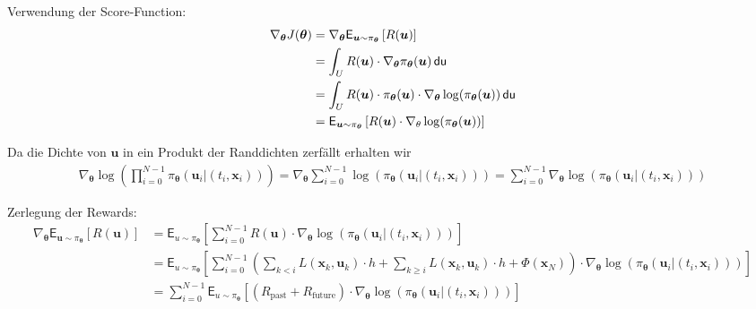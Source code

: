 \documentclass[a4paper, 12pt]{scrartcl}
\newcommand{\du}{\thinspace \mathsf{du}}
\begin{document}
Verwendung der Score-Function:
\begin{align*}
    \nabla_{\bm{\theta}} J(\bm{\bm{\theta}})
    &=
    \nabla_{\bm{\theta}}
    \mathsf{E}_{\bm{u} \sim \pi_{\bm{\theta}}}
    \left[
        R(\bm{u})  
    \right]
    \\
    &=
    \int_U 
    R(\bm{u}) 
    \cdot 
    \nabla_{\bm{\theta}} \pi_{\bm{\theta}}(\bm{u})   
    \du
    \\
    &=
    \int_U 
    R(\bm{u}) 
    \cdot 
    \pi_{\bm{\theta}}(\bm{u}) 
    \cdot 
    \nabla_{\bm{\theta}} \log(\pi_{\bm{\theta}}(\bm{u}))  
    \du
    \\
    &= 
    \mathsf{E}_{\bm{u} \sim \pi_{\bm{\theta}}}
    \left[
        R(\bm{u}) \cdot \nabla_{\theta} \log(\pi_{\bm{\theta}}(\bm{u}))
    \right]
\end{align*}

Da die Dichte von $\bm{u}$ in ein Produkt der Randdichten zerfällt erhalten wir
\begin{align*}
    \nabla_{\bm{\theta}}
    \log
    \left(
        \prod_{i=0}^{N-1}
        \pi_{\bm{\theta}}(\bm{u}_{i} | (t_i, \bm{x}_i))
    \right)
    =
    \nabla_{\bm{\theta}}
    \sum_{i=0}^{N-1}
    \log
    \left(
        \pi_{\bm{\theta}}(\bm{u}_{i} | (t_i, \bm{x}_i))
    \right)
    =
    \sum_{i=0}^{N-1}
    \nabla_{\bm{\theta}}
    \log
    \left(
        \pi_{\bm{\theta}}(\bm{u}_{i} | (t_i, \bm{x}_i))
    \right)
\end{align*}

Zerlegung der Rewards:
\begin{align*}
    \nabla_{\bm{\theta}}
    \mathsf{E}_{\bm{u} \sim \pi_{\bm{\theta}}}
    \left[
        R(\bm{u})  
    \right]
    &=
    \mathsf{E}_{u \sim \pi_{\bm{\theta}}}
    \left[
        \sum_{i=0}^{N-1}
        R(\bm{u})
        \cdot 
        \nabla_{\bm{\theta}}
        \log
        \left(
            \pi_{\bm{\theta}}(\bm{u}_{i} | (t_i, \bm{x}_i))
        \right)
    \right]
    \\
    &=
    \mathsf{E}_{u \sim \pi_{\bm{\theta}}}
    \left[
        \sum_{i=0}^{N-1}
        \left(
            \sum_{k<i} L(\bm{x}_k, \bm{u}_k) \cdot h 
            +
            \sum_{k \geq i} L(\bm{x}_k, \bm{u}_k) \cdot h + \Phi(\bm{x}_N)
        \right)
        \cdot 
        \nabla_{\bm{\theta}}
        \log
        \left(
            \pi_{\bm{\theta}}(\bm{u}_{i} | (t_i, \bm{x}_i))
        \right)
    \right]
    \\
    &=
    \sum_{i=0}^{N-1}
    \mathsf{E}_{u \sim \pi_{\bm{\theta}}}
    \left[
        \left(
            R_{\text{past}}
            +
            R_{\text{future}}
        \right)
        \cdot 
        \nabla_{\bm{\theta}}
        \log
        \left(
            \pi_{\bm{\theta}}(\bm{u}_{i} |(t_i, \bm{x}_i))
        \right)
    \right]
\end{align*}
\end{document}
